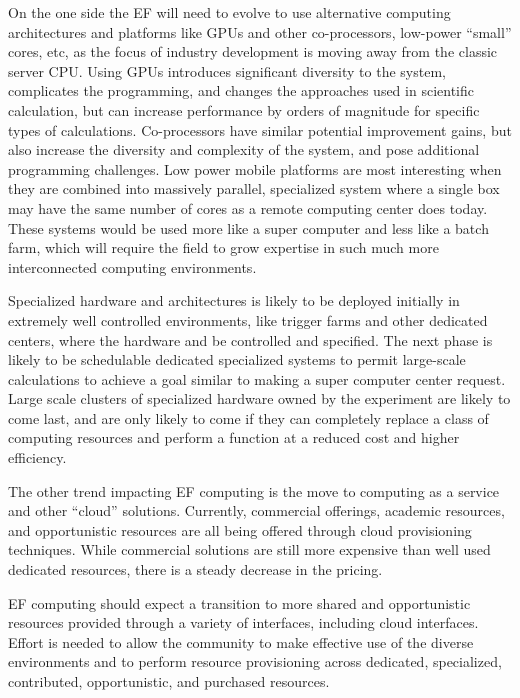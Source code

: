 On the one side the EF will need to evolve to use alternative
computing architectures and platforms like GPUs and other co-processors, 
low-power ``small'' cores, etc, as the focus of industry development is moving away
from the classic server CPU.  Using GPUs introduces significant diversity to
the system, complicates the programming, and changes the approaches used in
scientific calculation, but can increase performance by orders of magnitude
for specific types of calculations.  Co-processors have similar potential
improvement gains, but also increase the diversity and complexity of the system, and pose
additional programming challenges.  Low power mobile platforms are most
interesting when they are combined into massively parallel, specialized system
where a single box may have the same number of cores as a remote computing
center does today.  These systems would be used more like a super computer and
less like a batch farm, which will require the field to grow expertise in such
much more interconnected computing environments.

Specialized hardware and architectures is likely to be deployed initially in
extremely well controlled environments, like trigger farms and other dedicated
centers, where the hardware and be controlled and specified. The next phase is
likely to be schedulable dedicated specialized systems to permit large-scale
calculations to achieve a goal similar to making a super computer center
request.  Large scale clusters of specialized hardware owned by the experiment
are likely to come last, and are only likely to come if they can completely
replace a class of computing resources and perform a function at a reduced
cost and higher efficiency.

The other trend impacting EF computing is the move to
computing as a service and other ``cloud'' solutions.  Currently, 
commercial offerings, academic resources, and opportunistic resources
are all being offered through cloud provisioning techniques.  While
commercial solutions are still more expensive than well used dedicated
resources, there is a steady decrease in the pricing. 

EF computing should expect a transition to more shared and opportunistic
resources provided through a variety of interfaces, including cloud interfaces.  
Effort is needed
to allow the community to make effective use of the diverse
environments and to perform resource provisioning across dedicated,
specialized, contributed, opportunistic, and purchased resources.

